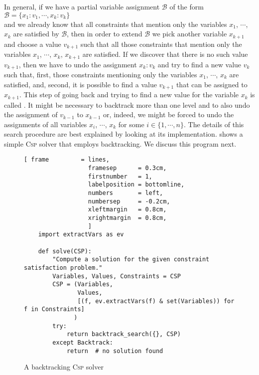 In general, if we have a partial variable assignment $\mathcal{B}$ of the form
\\[0.2cm]
\hspace*{1.3cm}
$\mathcal{B} = \{ x_1:v_1, \cdots, x_k:v_k \}$
\\[0.2cm]
and we already know that all constraints that mention only the variables $x_1$, $\cdots$, $x_k$ are satisfied
by $\mathcal{B}$, then in order to extend $\mathcal{B}$ we pick another variable $x_{k+1}$ and choose a
value $v_{k+1}$ such that all those constraints that mention only the variables  $x_1$, $\cdots$, $x_k$,
$x_{k+1}$ are satisfied.  If we discover that there is no such value $v_{k+1}$, then we have to undo the
assignment $x_k:v_k$ and try to find a new value $v_k$ such that, first, those constraints mentioning only 
the variables  $x_1$, $\cdots$, $x_k$ are satisfied, and, second, it is possible to find a value $v_{k+1}$ that
can be assigned to $x_{k+1}$.  This step of going back and trying to find a new value for the variable $x_k$ is
called .  It might be necessary to backtrack more than one level and to also undo the
assignment of $v_{k-1}$ to $x_{k-1}$ or, indeed, we might be forced to undo the assignments of all variables
$x_i$, $\cdots$, $x_k$ for some $i \in \{1,\cdots, n\}$.  The details of this search procedure are best
explained by looking at its implementation.  shows a simple \textsc{Csp} solver that
employs backtracking.  We discuss this program next.

\begin{figure}[!ht]
\centering
\begin{Verbatim}[ frame         = lines, 
                  framesep      = 0.3cm, 
                  firstnumber   = 1,
                  labelposition = bottomline,
                  numbers       = left,
                  numbersep     = -0.2cm,
                  xleftmargin   = 0.8cm,
                  xrightmargin  = 0.8cm,
                  ]
    import extractVars as ev
                  
    def solve(CSP):
        "Compute a solution for the given constraint satisfaction problem."
        Variables, Values, Constraints = CSP
        CSP = (Variables,
               Values,
               [(f, ev.extractVars(f) & set(Variables)) for f in Constraints]
              )
        try:
            return backtrack_search({}, CSP)
        except Backtrack:
            return  # no solution found
\end{Verbatim}
\vspace*{-0.3cm}
\caption{A backtracking \textsc{Csp} solver}
\label{fig:CSP-Solver.ipynb}
\end{figure}

